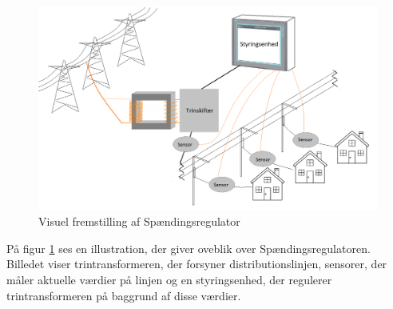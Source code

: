 \begin{figure}[H]
	\centering
	\includegraphics[width=1\textwidth]{figure/RigtBillede}
	\caption{Visuel fremstilling af Spændingsregulator}
	\label{fig:Rigtbillede}
\end{figure}

På figur \ref{fig:Rigtbillede} ses en illustration, der giver oveblik over Spændingsregulatoren. Billedet viser trintransformeren, der forsyner distributionslinjen, sensorer, der måler aktuelle værdier på linjen og en styringsenhed, der regulerer trintransformeren på baggrund af disse værdier. 